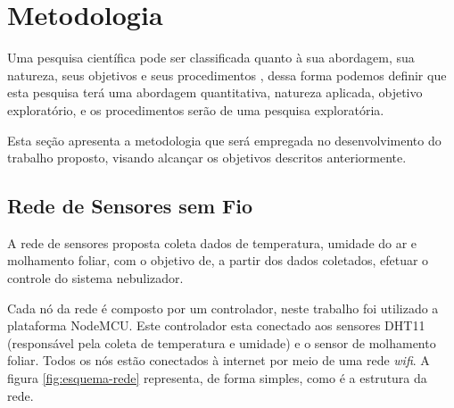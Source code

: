 \chapter{Metodologia}

Uma pesquisa científica pode ser classificada quanto à sua abordagem, sua natureza, seus objetivos e seus procedimentos \cite{gerhardt2009tiposdepesquisa}, dessa forma podemos definir que esta pesquisa terá uma abordagem quantitativa, natureza aplicada, objetivo exploratório, e os procedimentos serão de uma pesquisa exploratória.

Esta seção apresenta a metodologia que será empregada no desenvolvimento do trabalho proposto, visando alcançar os objetivos descritos anteriormente.


\section{Rede de Sensores sem Fio}
A rede de sensores proposta coleta dados de temperatura, umidade do ar e molhamento foliar, com o objetivo de, a partir dos dados coletados, efetuar o controle do sistema nebulizador.

Cada nó da rede é composto por um controlador, neste trabalho foi utilizado a plataforma NodeMCU. Este controlador esta conectado aos sensores DHT11 (responsável pela coleta de temperatura e umidade) e o sensor de molhamento foliar. Todos os nós estão conectados à internet por meio de uma rede \textit{wifi}. A figura \ref{fig:esquema-rede} representa, de forma simples, como é a estrutura da rede.

